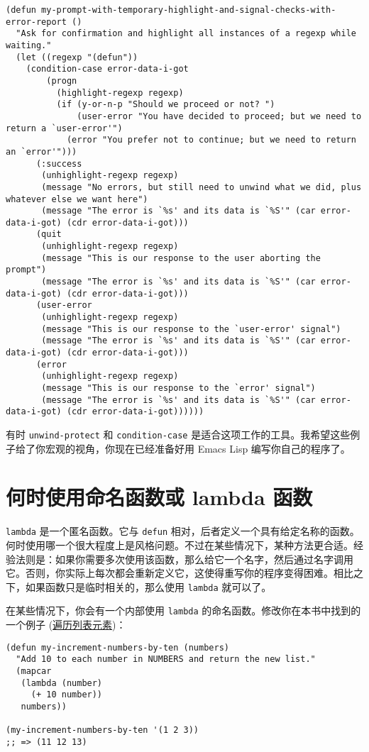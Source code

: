 \documentclass[11pt]{ctexart}
\begin{document}
\begin{verbatim}
(defun my-prompt-with-temporary-highlight-and-signal-checks-with-error-report ()
  "Ask for confirmation and highlight all instances of a regexp while waiting."
  (let ((regexp "(defun"))
    (condition-case error-data-i-got
        (progn
          (highlight-regexp regexp)
          (if (y-or-n-p "Should we proceed or not? ")
              (user-error "You have decided to proceed; but we need to return a `user-error'")
            (error "You prefer not to continue; but we need to return an `error'")))
      (:success
       (unhighlight-regexp regexp)
       (message "No errors, but still need to unwind what we did, plus whatever else we want here")
       (message "The error is `%s' and its data is `%S'" (car error-data-i-got) (cdr error-data-i-got)))
      (quit
       (unhighlight-regexp regexp)
       (message "This is our response to the user aborting the prompt")
       (message "The error is `%s' and its data is `%S'" (car error-data-i-got) (cdr error-data-i-got)))
      (user-error
       (unhighlight-regexp regexp)
       (message "This is our response to the `user-error' signal")
       (message "The error is `%s' and its data is `%S'" (car error-data-i-got) (cdr error-data-i-got)))
      (error
       (unhighlight-regexp regexp)
       (message "This is our response to the `error' signal")
       (message "The error is `%s' and its data is `%S'" (car error-data-i-got) (cdr error-data-i-got))))))
\end{verbatim}

有时 \texttt{unwind-protect} 和 \texttt{condition-case} 是适合这项工作的工具。我希望这些例子给了你宏观的视角，你现在已经准备好用 Emacs Lisp 编写你自己的程序了。
\section{何时使用命名函数或 lambda 函数}
\label{sec:orgf242639}
\texttt{lambda} 是一个匿名函数。它与 \texttt{defun} 相对，后者定义一个具有给定名称的函数。何时使用哪一个很大程度上是风格问题。不过在某些情况下，某种方法更合适。经验法则是：如果你需要多次使用该函数，那么给它一个名字，然后通过名字调用它。否则，你实际上每次都会重新定义它，这使得重写你的程序变得困难。相比之下，如果函数只是临时相关的，那么使用 \texttt{lambda} 就可以了。

在某些情况下，你会有一个内部使用 \texttt{lambda} 的命名函数。修改你在本书中找到的一个例子 (\hyperref[sec:org94bd4fd]{遍历列表元素})：

\begin{verbatim}
(defun my-increment-numbers-by-ten (numbers)
  "Add 10 to each number in NUMBERS and return the new list."
  (mapcar
   (lambda (number)
     (+ 10 number))
   numbers))

(my-increment-numbers-by-ten '(1 2 3))
;; => (11 12 13)
\end{verbatim}
\end{document}

